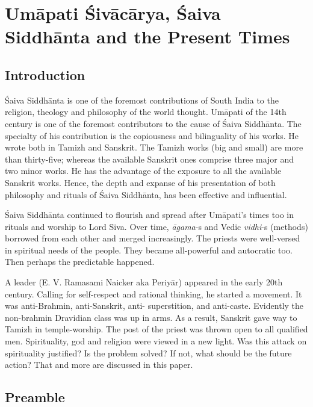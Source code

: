 
\chapter{Umāpati Śivācārya, Śaiva Siddhānta and the Present Times}



\section{Introduction}

Śaiva Siddhānta is one of the foremost contributions of South India to the religion, theology and philosophy of the world thought. Umāpati of the 14th century is one of the foremost contributors to the cause of Śaiva Siddhānta. The specialty of his contribution is the copiousness and bilinguality of his works. He wrote both in Tamizh and Sanskrit. The Tamizh works (big and small) are more than thirty-five; whereas the available Sanskrit ones comprise three major and two minor works. He has the advantage of the exposure to all the available Sanskrit works. Hence, the depth and expanse of his presentation of both philosophy and rituals of Śaiva Siddhānta, has been effective and influential.

Śaiva Siddhānta continued to flourish and spread after Umāpati’s times too in rituals and worship to Lord Siva. Over time, \textit{āgama}-s and Vedic \textit{vidhi}-s (methods) borrowed from each other and merged increasingly. The priests were well-versed in spiritual needs of the people. They became all-powerful and autocratic too. Then perhaps the predictable happened.

A leader (E. V. Ramasami Naicker aka Periyār) appeared in the early 20th century. Calling for self-respect and rational thinking, he started a movement. It was anti-Brahmin, anti-Sanskrit, anti- superstition, and anti-caste. Evidently the non-brahmin Dravidian class was up in arms. As a result, Sanskrit gave way to Tamizh in temple-worship. The post of the priest was thrown open to all qualified men. Spirituality, god and religion were viewed in a new light. Was this attack on spirituality justified? Is the problem solved? If not, what should be the future action? That and more are discussed in this paper.


\section{Preamble}

